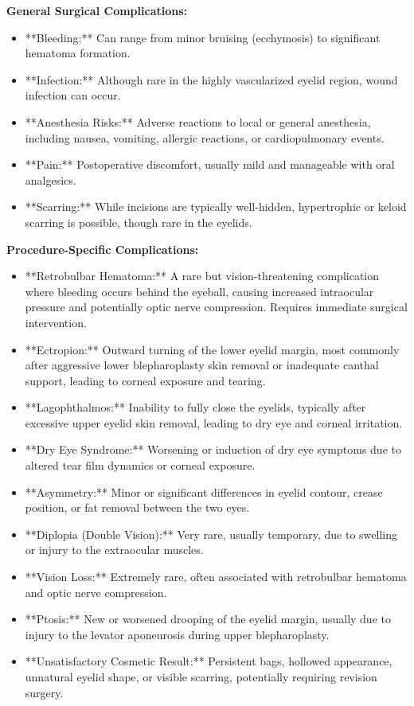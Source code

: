 \textbf{General Surgical Complications:}
\begin{itemize}
  \item **Bleeding:** Can range from minor bruising (ecchymosis) to significant hematoma formation.
  \item **Infection:** Although rare in the highly vascularized eyelid region, wound infection can occur.
  \item **Anesthesia Risks:** Adverse reactions to local or general anesthesia, including nausea, vomiting, allergic reactions, or cardiopulmonary events.
  \item **Pain:** Postoperative discomfort, usually mild and manageable with oral analgesics.
\item **Scarring:** While incisions are typically well-hidden, hypertrophic or keloid scarring is possible, though rare in the eyelids.
\end{itemize}

\textbf{Procedure-Specific Complications:}
\begin{itemize}
  \item **Retrobulbar Hematoma:** A rare but vision-threatening complication where bleeding occurs behind the eyeball, causing increased intraocular pressure and potentially optic nerve compression. Requires immediate surgical intervention.
  \item **Ectropion:** Outward turning of the lower eyelid margin, most commonly after aggressive lower blepharoplasty skin removal or inadequate canthal support, leading to corneal exposure and tearing.
  \item **Lagophthalmos:** Inability to fully close the eyelids, typically after excessive upper eyelid skin removal, leading to dry eye and corneal irritation.
  \item **Dry Eye Syndrome:** Worsening or induction of dry eye symptoms due to altered tear film dynamics or corneal exposure.
  \item **Asymmetry:** Minor or significant differences in eyelid contour, crease position, or fat removal between the two eyes.
  \item **Diplopia (Double Vision):** Very rare, usually temporary, due to swelling or injury to the extraocular muscles.
  \item **Vision Loss:** Extremely rare, often associated with retrobulbar hematoma and optic nerve compression.
  \item **Ptosis:** New or worsened drooping of the eyelid margin, usually due to injury to the levator aponeurosis during upper blepharoplasty.
  \item **Unsatisfactory Cosmetic Result:** Persistent bags, hollowed appearance, unnatural eyelid shape, or visible scarring, potentially requiring revision surgery.
\end{itemize}

